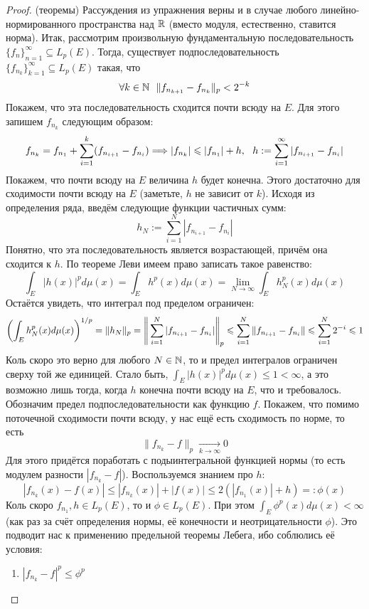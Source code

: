 \begin{proof} (теоремы)
	Рассуждения из упражнения верны и в случае любого линейно-нормированного пространства над $\mathbb{R}$ (вместо модуля, естественно, ставится норма). Итак, рассмотрим произвольную фундаментальную последовательность $\{f_n\}_{n = 1}^\infty \subseteq L_p(E)$. Тогда, существует подпоследовательность $\{f_{n_k}\}_{k = 1}^\infty \subseteq L_p(E)$ такая, что
	\[
		\forall k \in \mathbb{N}\ \ \|f_{n_{k + 1}} - f_{n_k}\|_p < 2^{-k}
	\]
	Покажем, что эта последовательность сходится почти всюду на $E$. Для этого запишем $f_{n_k}$ следующим образом:
	\[
		f_{n_k} = f_{n_1} + \sum_{i = 1}^k (f_{n_{i + 1}} - f_{n_i}) \Longrightarrow |f_{n_k}| \leqslant |f_{n_1}| + h,\ \ h := \sum_{i = 1}^\infty |f_{n_{i + 1}} - f_{n_i}|
	\]
	Покажем, что почти всюду на $E$ величина $h$ будет конечна. Этого достаточно для сходимости почти всюду на $E$ (заметьте, $h$ не зависит от $k$). Исходя из определения ряда, введём следующие функции частичных сумм:
	\[
		h_N := \sum_{i = 1}^N |f_{n_{i + 1}} - f_{n_i}|
	\]
	Понятно, что эта последовательность является возрастающей, причём она сходится к $h$. По теореме Леви имеем право записать такое равенство:
	\[
		\int_E |h(x)|^pd\mu(x) = \int_E h^p(x)d\mu(x) = \lim_{N \to \infty} \int_E h_N^p(x)d\mu(x)
	\]
	Остаётся увидеть, что интеграл под пределом ограничен:
	\[
		\left(\int_E h_N^p(x)d\mu(x)\right)^{1 / p} = \|h_N\|_p = \Bigg\|\sum_{i = 1}^N |f_{n_{i + 1}} - f_{n_i}|\Bigg\|_p \leqslant \sum_{i = 1}^N \|f_{n_{i + 1}} - f_{n_i}\| \leqslant \sum_{i = 1}^N 2^{-i} \leqslant 1
	\]
	Коль скоро это верно для любого $N \in \mathbb{N}$, то и предел интегралов ограничен сверху той же единицей. Стало быть, $\int_E |h(x)|^pd\mu(x) \le 1 < \infty$, а это возможно лишь тогда, когда $h$ конечна почти всюду на $E$, что и требовалось. Обозначим предел подпоследовательности как функцию $f$. Покажем, что помимо поточечной сходимости почти всюду, у нас ещё есть сходимость по норме, то есть
	\[
		\|f_{n_k} - f\|_p \xrightarrow[k \to \infty]{} 0
	\]
	Для этого придётся поработать с подыинтегральной функцией нормы (то есть модулем разности $|f_{n_k} - f|$). Воспользуемся знанием про $h$:
	\[
		|f_{n_k}(x) - f(x)| \le |f_{n_k}(x)| + |f(x)| \le 2(|f_{n_1}(x)| + h) =: \phi(x)
	\]
	Коль скоро $f_{n_1}, h \in L_p(E)$, то и $\phi \in L_p(E)$. При этом $\int_E \phi^p(x)d\mu(x) < \infty$ (как раз за счёт определения нормы, её конечности и неотрицательности $\phi$). Это подводит нас к применению предельной теоремы Лебега, ибо соблюлись её условия:
	\begin{enumerate}
		\item $|f_{n_k} - f|^p \le \phi^p$
		

\end{enumerate}
\end{proof}
